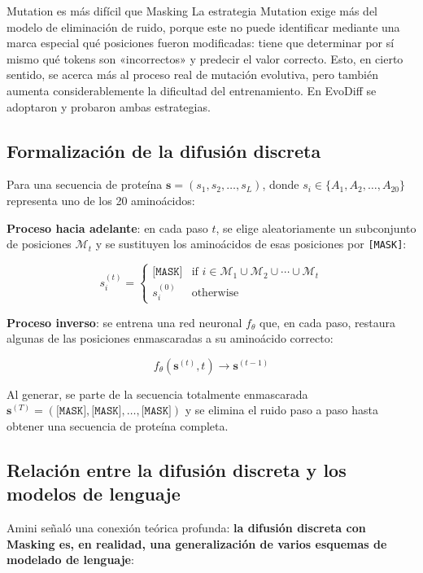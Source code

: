 \begin{warningbox}{Mutation es más difícil que Masking}
La estrategia Mutation exige más del modelo de eliminación de ruido, porque este no puede identificar mediante una marca especial qué posiciones fueron modificadas: tiene que determinar por sí mismo qué tokens son «incorrectos» y predecir el valor correcto. Esto, en cierto sentido, se acerca más al proceso real de mutación evolutiva, pero también aumenta considerablemente la dificultad del entrenamiento. En EvoDiff se adoptaron y probaron ambas estrategias.
\end{warningbox}

\subsection{Formalización de la difusión discreta}

Para una secuencia de proteína $\mathbf{s} = (s_1, s_2, \ldots, s_L)$, donde $s_i \in \{A_1, A_2, \ldots, A_{20}\}$ representa uno de los 20 aminoácidos:

\textbf{Proceso hacia adelante}: en cada paso $t$, se elige aleatoriamente un subconjunto de posiciones $\mathcal{M}_t$ y se sustituyen los aminoácidos de esas posiciones por \texttt{[MASK]}:

$$s_i^{(t)} = \begin{cases} \texttt{[MASK]} & \text{if } i \in \mathcal{M}_1 \cup \mathcal{M}_2 \cup \cdots \cup \mathcal{M}_t \\ s_i^{(0)} & \text{otherwise} \end{cases}$$

\textbf{Proceso inverso}: se entrena una red neuronal $f_\theta$ que, en cada paso, restaura algunas de las posiciones enmascaradas a su aminoácido correcto:

$$f_\theta(\mathbf{s}^{(t)}, t) \rightarrow \mathbf{s}^{(t-1)}$$

Al generar, se parte de la secuencia totalmente enmascarada $\mathbf{s}^{(T)} = (\texttt{[MASK]}, \texttt{[MASK]}, \ldots, \texttt{[MASK]})$ y se elimina el ruido paso a paso hasta obtener una secuencia de proteína completa.

\subsection{Relación entre la difusión discreta y los modelos de lenguaje}

Amini señaló una conexión teórica profunda: \textbf{la difusión discreta con Masking es, en realidad, una generalización de varios esquemas de modelado de lenguaje}:

